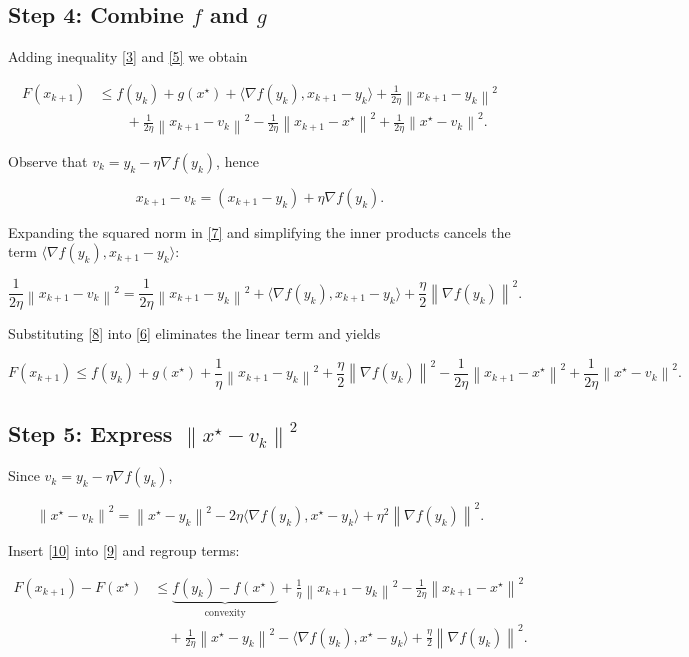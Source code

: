 \documentclass{article}
\newcommand{\norm}[1]{\left\lVert#1\right\rVert}
\begin{document}
\subsection*{Step 4: Combine $f$ and $g$}
Adding inequality \eqref{3} and \eqref{5} we obtain

\[
\begin{aligned}
F(x_{k+1}) 
&\le f(y_k)+g(x^{\star})+\langle\nabla f(y_k),x_{k+1}-y_k\rangle
      +\frac{1}{2\eta}\norm{x_{k+1}-y_k}^{2}\\
&\qquad +\frac{1}{2\eta}\norm{x_{k+1}-v_k}^{2}
      -\frac{1}{2\eta}\norm{x_{k+1}-x^{\star}}^{2}
      +\frac{1}{2\eta}\norm{x^{\star}-v_k}^{2}.
\end{aligned}
\tag{6}
\]

Observe that $v_k=y_k-\eta\nabla f(y_k)$, hence  

\[
x_{k+1}-v_k = (x_{k+1}-y_k)+\eta\nabla f(y_k).
\tag{7}
\]

Expanding the squared norm in \eqref{7} and simplifying the inner products
cancels the term $\langle\nabla f(y_k),x_{k+1}-y_k\rangle$:

\[
\frac{1}{2\eta}\norm{x_{k+1}-v_k}^{2}
= \frac{1}{2\eta}\norm{x_{k+1}-y_k}^{2}
  +\langle\nabla f(y_k),x_{k+1}-y_k\rangle
  +\frac{\eta}{2}\norm{\nabla f(y_k)}^{2}.
\tag{8}
\]

Substituting \eqref{8} into \eqref{6} eliminates the linear term and yields

\[
F(x_{k+1})\le f(y_k)+g(x^{\star})
            +\frac{1}{\eta}\norm{x_{k+1}-y_k}^{2}
            +\frac{\eta}{2}\norm{\nabla f(y_k)}^{2}
            -\frac{1}{2\eta}\norm{x_{k+1}-x^{\star}}^{2}
            +\frac{1}{2\eta}\norm{x^{\star}-v_k}^{2}.
\tag{9}
\]

\subsection*{Step 5: Express $\norm{x^{\star}-v_k}^{2}$}
Since $v_k=y_k-\eta\nabla f(y_k)$,

\[
\norm{x^{\star}-v_k}^{2}
= \norm{x^{\star}-y_k}^{2}
  -2\eta\langle\nabla f(y_k),x^{\star}-y_k\rangle
  +\eta^{2}\norm{\nabla f(y_k)}^{2}.
\tag{10}
\]

Insert \eqref{10} into \eqref{9} and regroup terms:

\[
\begin{aligned}
F(x_{k+1})-F(x^{\star})
&\le \underbrace{f(y_k)-f(x^{\star})}_{\text{convexity}} 
   +\frac{1}{\eta}\norm{x_{k+1}-y_k}^{2}
   -\frac{1}{2\eta}\norm{x_{k+1}-x^{\star}}^{2}\\
&\quad +\frac{1}{2\eta}\norm{x^{\star}-y_k}^{2}
   -\langle\nabla f(y_k),x^{\star}-y_k\rangle
   +\frac{\eta}{2}\norm{\nabla f(y_k)}^{2}.
\end{aligned}
\tag{11}
\]
\end{document}

